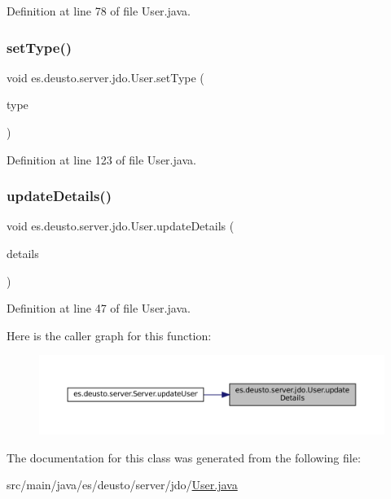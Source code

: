 Definition at line 78 of file User.\+java.

\mbox{\label{classes_1_1deusto_1_1server_1_1jdo_1_1_user_ac56a41d0180453b832c405cc0d94d170}} 
\subsubsection{\texorpdfstring{setType()}{setType()}}
{\footnotesize\ttfamily void es.\+deusto.\+server.\+jdo.\+User.\+set\+Type (\begin{DoxyParamCaption}\item[{\mbox{\hyperlink{enumes_1_1deusto_1_1server_1_1jdo_1_1_user_type}{User\+Type}}}]{type }\end{DoxyParamCaption})}



Definition at line 123 of file User.\+java.

\mbox{\label{classes_1_1deusto_1_1server_1_1jdo_1_1_user_a2abb7df132d0ded1f4187d900416d65d}} 
\subsubsection{\texorpdfstring{updateDetails()}{updateDetails()}}
{\footnotesize\ttfamily void es.\+deusto.\+server.\+jdo.\+User.\+update\+Details (\begin{DoxyParamCaption}\item[{\mbox{\hyperlink{classes_1_1deusto_1_1server_1_1data_1_1_user_details_d_t_o}{User\+Details\+D\+TO}}}]{details }\end{DoxyParamCaption})}



Definition at line 47 of file User.\+java.

Here is the caller graph for this function\+:
\nopagebreak
\begin{figure}[H]
\begin{center}
\leavevmode
\includegraphics[width=350pt]{classes_1_1deusto_1_1server_1_1jdo_1_1_user_a2abb7df132d0ded1f4187d900416d65d_icgraph}
\end{center}
\end{figure}


The documentation for this class was generated from the following file\+:\begin{DoxyCompactItemize}
\item 
src/main/java/es/deusto/server/jdo/\mbox{\hyperlink{_user_8java}{User.\+java}}\end{DoxyCompactItemize}
